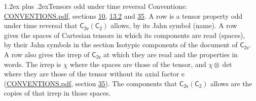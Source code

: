 \documentclass[10pt,a4paper]{article}
\makeatletter
\renewcommand\section{\@startsection{section}{1}{\z@}{-3ex plus -1ex minus -.2ex}%
  {1.2ex plus .2ex}{\normalfont\large\sffamily\bfseries\color{parttitle}}}
\numberwithin{equation}{section}
\newcommand{\grp}[1]{\mathsf{#1}}
\newcommand{\irrprod}{\otimes}
\makeatother
\begin{document}
\section{Tensors odd under time reversal}\label{s:time_odd}
Conventions: \href{../../CONVENTIONS.pdf}{CONVENTIONS.pdf}, sections \href{../../../rotation/CONVENTIONS.pdf\#conv.10}{10}, \href{../../../rotation/CONVENTIONS.pdf\#conv.13.2}{13.2} and \href{../../CONVENTIONS.pdf\#conv.35}{35}.
\leavevmode\label{n:head.name.property}A row is a tensor property odd under time reversal that $\grp{C_{2v}}(\grp{C_{2}})$ allows, by its Jahn symbol (name). \label{n:head.spaces}A row gives the spaces of Cartesian tensors in which its components are read (spaces), by their Jahn symbols in the section Isotypic components of the document of \href{../../../rotation/data/pdf/C2v.pdf}{$\grp{C_{2v}}$}. \label{n:head.properties}A row also gives the irrep of $\grp{C_{2v}}$ at which they are read and the properties in words. The irrep is $\chi$ where the spaces are those of the tensor, and $\chi \irrprod \det$ where they are those of the tensor without its axial factor e (\href{../../CONVENTIONS.pdf}{CONVENTIONS.pdf}, section \href{../../CONVENTIONS.pdf\#conv.35}{35}). The components that $\grp{C_{2v}}(\grp{C_{2}})$ allows are the copies of that irrep in those spaces.
\end{document}
